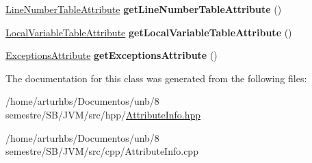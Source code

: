 \begin{DoxyCompactItemize}
\item 
\hyperlink{classLineNumberTableAttribute}{Line\+Number\+Table\+Attribute} {\bfseries get\+Line\+Number\+Table\+Attribute} ()\hypertarget{classAttributeInfo_a17bc4e1435137d714da8942171f82012}{}\label{classAttributeInfo_a17bc4e1435137d714da8942171f82012}

\item 
\hyperlink{classLocalVariableTableAttribute}{Local\+Variable\+Table\+Attribute} {\bfseries get\+Local\+Variable\+Table\+Attribute} ()\hypertarget{classAttributeInfo_a916735dc9f933dbc80ac4e7d61a07768}{}\label{classAttributeInfo_a916735dc9f933dbc80ac4e7d61a07768}

\item 
\hyperlink{classExceptionsAttribute}{Exceptions\+Attribute} {\bfseries get\+Exceptions\+Attribute} ()\hypertarget{classAttributeInfo_a0b0f4877987a0ce9eebe156871afe2d7}{}\label{classAttributeInfo_a0b0f4877987a0ce9eebe156871afe2d7}

\end{DoxyCompactItemize}


The documentation for this class was generated from the following files\+:\begin{DoxyCompactItemize}
\item 
/home/arturhbs/\+Documentos/unb/8 semestre/\+S\+B/\+J\+V\+M/src/hpp/\hyperlink{AttributeInfo_8hpp}{Attribute\+Info.\+hpp}\item 
/home/arturhbs/\+Documentos/unb/8 semestre/\+S\+B/\+J\+V\+M/src/cpp/Attribute\+Info.\+cpp\end{DoxyCompactItemize}
